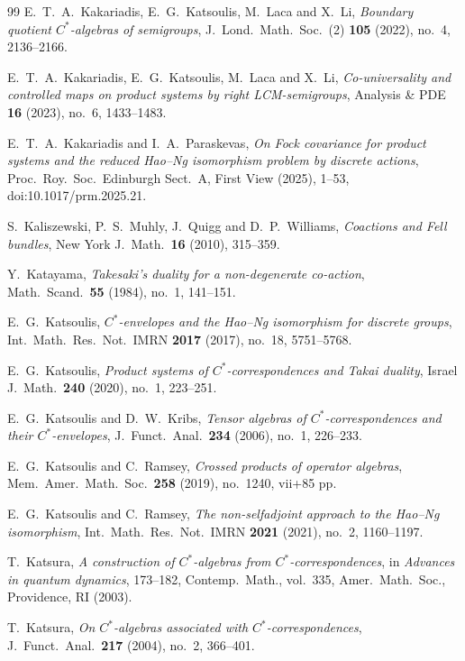 \documentclass[11pt,final]{amsart}
\numberwithin{equation}{section}
\theoremstyle{plain}
\theoremstyle{definition}
\theoremstyle{remark}
\begin{document}
\begin{thebibliography}{99}
E.\ T.\ A.\ Kakariadis, E.\ G.\ Katsoulis, M.\ Laca and X.\ Li,
\textit{Boundary quotient $C^*$-algebras of semigroups},
J.\ Lond.\ Math.\ Soc.\ (2) \textbf{105} (2022), no.\ 4, 2136--2166.

 E.\ T.\ A.\ Kakariadis,  E.\ G.\ Katsoulis, M.\ Laca and X.\ Li,
\textit{Co-universality and controlled maps on product systems by right LCM-semigroups}, 
Analysis \& PDE \textbf{16} (2023), no.\ 6, 1433--1483.

E.\ T.\ A.\ Kakariadis and I.\ A.\ Paraskevas,
\textit{On Fock covariance for product systems and the reduced Hao--Ng
isomorphism problem by discrete actions},
Proc.\ Roy.\ Soc.\ Edinburgh Sect.\ A, First View (2025), 1--53,
doi:10.1017/prm.2025.21.

S.\ Kaliszewski, P.\ S.\ Muhly, J.\ Quigg and D.\ P.\ Williams,
\textit{Coactions and Fell bundles},
New York J.\ Math.\ \textbf{16} (2010), 315--359.

Y.\ Katayama,
\textit{Takesaki's duality for a non-degenerate co-action},
Math.\ Scand.\ \textbf{55} (1984), no.\ 1, 141--151.

E.\ G.\ Katsoulis,
\textit{$C^*$-envelopes and the Hao--Ng isomorphism for discrete groups},
Int.\ Math.\ Res.\ Not.\ IMRN \textbf{2017} (2017), no.\ 18, 5751--5768.

E.\ G.\ Katsoulis,
\textit{Product systems of $C^*$-correspondences and Takai duality},
Israel J.\ Math.\ \textbf{240} (2020), no.\ 1, 223--251.

E.\ G.\ Katsoulis and D.\ W.\ Kribs,
\textit{Tensor algebras of $C^*$-correspondences and their $C^*$-envelopes},
J.\ Funct.\ Anal.\ \textbf{234} (2006), no.\ 1, 226--233.

E.\ G.\ Katsoulis and C.\ Ramsey,
\textit{Crossed products of operator algebras},
Mem.\ Amer.\ Math.\ Soc.\ \textbf{258} (2019), no.\ 1240, vii+85 pp.

E.\ G.\ Katsoulis and C.\ Ramsey,
\textit{The non-selfadjoint approach to the Hao--Ng isomorphism},
Int.\ Math.\ Res.\ Not.\ IMRN \textbf{2021} (2021), no.\ 2, 1160--1197.

T.\ Katsura,
\textit{A construction of $C^*$-algebras from $C^*$-correspondences},
in \textit{Advances in quantum dynamics}, 173--182,
Contemp.\ Math., vol.\ 335,
Amer.\ Math.\ Soc., Providence, RI (2003).

T.\ Katsura,
\textit{On $C^*$-algebras associated with $C^*$-correspondences},
J.\ Funct.\ Anal.\ \textbf{217} (2004), no.\ 2, 366--401.


\end{thebibliography}
\end{document}
